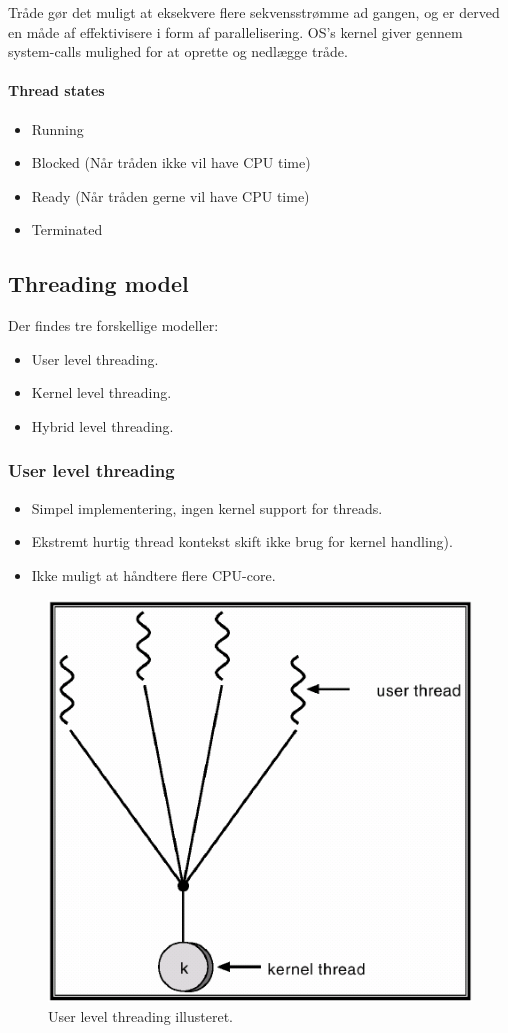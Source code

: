 Tråde gør det muligt at eksekvere flere sekvensstrømme ad gangen, og er derved en måde af effektivisere i form af parallelisering. OS's kernel giver gennem system-calls mulighed for at oprette og nedlægge tråde.

\paragraph{Thread states}
\begin{itemize}
	\item Running
	\item Blocked (Når tråden ikke vil have CPU time)
	\item Ready (Når tråden gerne vil have CPU time)
	\item Terminated
\end{itemize}


\subsection{Threading model}
Der findes tre forskellige modeller:

\begin{itemize}
	\item User level threading.
	\item Kernel level threading.
	\item Hybrid level threading.
\end{itemize}

\subsubsection{User level threading}
\begin{itemize}
	\item Simpel implementering, ingen kernel support for threads.
	\item Ekstremt hurtig thread kontekst skift ikke brug for kernel handling).
	\item Ikke muligt at håndtere flere CPU-core.
\end{itemize}

\begin{figure}[H]
	\centering
	\includegraphics[width=0.5\linewidth]{figs/spm1/userthreads}
	\caption{User level threading illusteret.}
	\label{fig:userthreads}
\end{figure}

